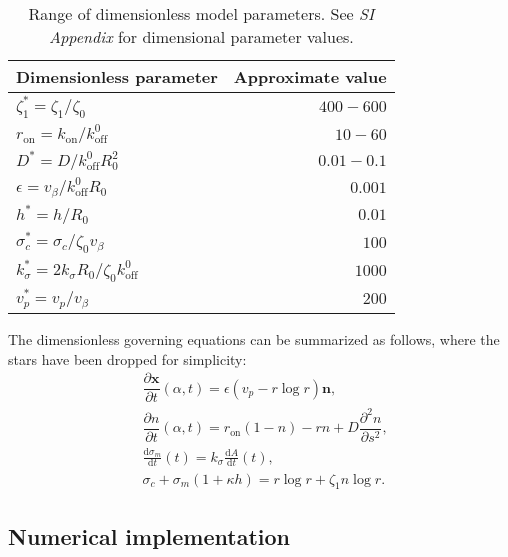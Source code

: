 \documentclass[12pt]{article}
\newcommand{\dd}{\mathrm{d}}
\newcommand{\mbf}{\boldsymbol}
\newcommand{\pdif}[2]{\dfrac{\partial #1}{\partial #2}}
\begin{document}
        \begin{table}[t]
            \centering
            \caption{Range of dimensionless model parameters. See \textit{SI Appendix} for dimensional parameter values.}
            \begin{tabular}{lr}
            Dimensionless parameter         & Approximate value  \\
            \hline
                $\zeta_1^\ast = \zeta_1/\zeta_0$   & $400-600$ \\
                $r_{\text{on}}=k_{\text{on}}/k_{\text{off}}^0$ &  $10-60$ \\
                $D^\ast=D/k_{\text{off}}^0 R_0^2$ & $0.01-0.1$ \\
            \hline
                $\epsilon=v_\beta / k_{\text{off}}^0 R_0$ & $0.001$ \\
                $h^\ast = h/R_0$ & $0.01$ \\
                $\sigma_c^\ast = \sigma_c/\zeta_0 v_\beta$ & $100$\\
                $k_\sigma^\ast = 2k_\sigma R_0/\zeta_0 k_{\text{off}}^0$ & $1000$ \\
                $v_p^\ast=v_p/v_\beta$ & $200$\\
        \hline
        \end{tabular}
        \label{dimensionless parameters}
    \end{table}    


    The dimensionless governing equations can be summarized as follows, where the stars have been dropped for simplicity: 
    \begin{align}
        & \pdif{\mbf{x}}{t}(\alpha,t) = \epsilon(v_p - r\log r)\mbf{n}, \label{shape} \\
        & \pdif{n}{t}(\alpha,t) = r_{\text{on}}(1-n) - rn + D \pdif{^2n}{s^2}, \label{kinetic}\\
        & \frac{\dd \sigma_m}{\dd t}(t) = k_\sigma \frac{\dd A}{\dd t}(t),\label{elasticity}\\ 
        & \sigma_c + \sigma_m(1 + \kappa h) = r\log r + \zeta_1 n\log r. \label{force balance}
    \end{align}

    \subsection*{Numerical implementation}
        
\end{document}
